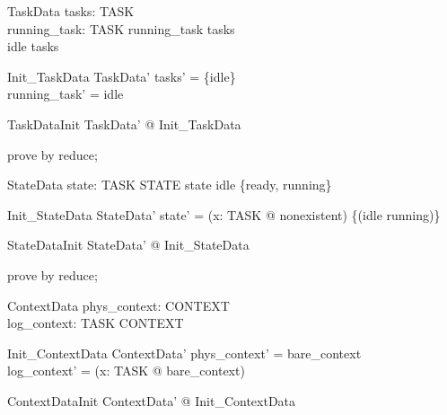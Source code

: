 \begin{schema}{TaskData}
  tasks: \power  TASK\\
  running\_task: TASK
\where
  running\_task \in  tasks\\
  idle \in  tasks
\end{schema}

\begin{schema}{Init\_TaskData}
  TaskData'
\where
  tasks' = \{idle\}\\
  running\_task' = idle
\end{schema}

\begin{theorem}{TaskDataInit}
\exists  TaskData' @ Init\_TaskData
\end{theorem}

\begin{zproof}[TaskDataInit]
prove by reduce;
\end{zproof}

\begin{schema}{StateData}
  state: TASK \fun  STATE
\where
  state idle \in  \{ready, running\}
\end{schema}

\begin{schema}{Init\_StateData}
  StateData'
\where
  state' = (\lambda  x: TASK @ nonexistent) \oplus  \{(idle \mapsto  running)\}
\end{schema}

\begin{theorem}{StateDataInit}
\exists  StateData' @ Init\_StateData
\end{theorem}

\begin{zproof}[StateDataInit]
prove by reduce;
\end{zproof}

\begin{schema}{ContextData}
  phys\_context: CONTEXT\\
  log\_context: TASK \fun  CONTEXT
\end{schema}

\begin{schema}{Init\_ContextData}
  ContextData'
\where
  phys\_context' = bare\_context\\
  log\_context' = (\lambda  x: TASK @ bare\_context)
\end{schema}

\begin{theorem}{ContextDataInit}
\exists  ContextData' @ Init\_ContextData
\end{theorem}

